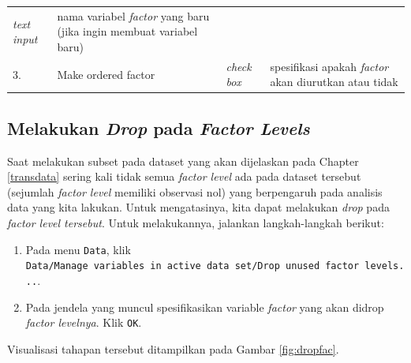 \documentclass[12pt,]{krantz}
\providecommand{\tightlist}{%
  \setlength{\itemsep}{0pt}\setlength{\parskip}{0pt}}
\begin{document}
\begin{longtable}[]{@{}llll@{}}
\begin{minipage}[t]{0.09\columnwidth}
\emph{text input}\strut
\end{minipage} & \begin{minipage}[t]{0.61\columnwidth}\raggedright
nama variabel \emph{factor} yang baru (jika ingin membuat variabel baru)\strut
\end{minipage}\tabularnewline
\begin{minipage}[t]{0.04\columnwidth}\raggedright
3.\strut
\end{minipage} & \begin{minipage}[t]{0.14\columnwidth}\raggedright
Make ordered factor\strut
\end{minipage} & \begin{minipage}[t]{0.09\columnwidth}\raggedright
\emph{check box}\strut
\end{minipage} & \begin{minipage}[t]{0.61\columnwidth}\raggedright
spesifikasi apakah \emph{factor} akan diurutkan atau tidak\strut
\end{minipage}\tabularnewline
\bottomrule
\end{longtable}

\hypertarget{melakukan-drop-pada-factor-levels}{%
\subsection{\texorpdfstring{Melakukan \emph{Drop} pada \emph{Factor Levels}}{Melakukan Drop pada Factor Levels}}\label{melakukan-drop-pada-factor-levels}}

Saat melakukan subset pada dataset yang akan dijelaskan pada Chapter \ref{transdata} sering kali tidak semua \emph{factor level} ada pada dataset tersebut (sejumlah \emph{factor level} memiliki observasi nol) yang berpengaruh pada analisis data yang kita lakukan. Untuk mengatasinya, kita dapat melakukan \emph{drop} pada \emph{factor level tersebut}. Untuk melakukannya, jalankan langkah-langkah berikut:

\begin{enumerate}
\def\labelenumi{\arabic{enumi}.}
\tightlist
\item
  Pada menu \texttt{Data}, klik \texttt{Data/Manage\ variables\ in\ active\ data\ set/Drop\ unused\ factor\ levels...}.
\item
  Pada jendela yang muncul spesifikasikan variable \emph{factor} yang akan didrop \emph{factor levelnya}. Klik \texttt{OK}.
\end{enumerate}

Visualisasi tahapan tersebut ditampilkan pada Gambar \ref{fig:dropfac}.
\end{document}
